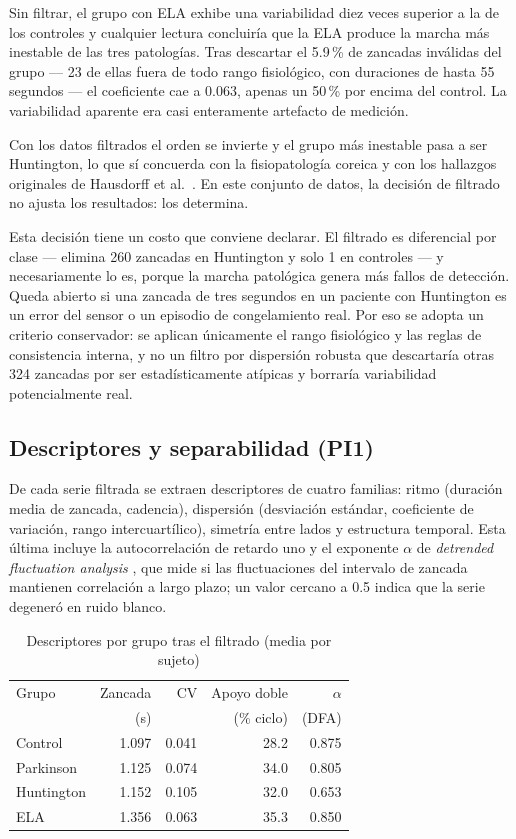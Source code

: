 \documentclass[conference]{IEEEtran}
\begin{document}
Sin filtrar, el grupo con ELA exhibe una variabilidad diez veces superior a la de los controles y cualquier lectura concluiría que la ELA produce la marcha más inestable de las tres patologías. Tras descartar el 5.9\,\% de zancadas inválidas del grupo --- 23 de ellas fuera de todo rango fisiológico, con duraciones de hasta 55 segundos --- el coeficiente cae a 0.063, apenas un 50\,\% por encima del control. La variabilidad aparente era casi enteramente artefacto de medición.

Con los datos filtrados el orden se invierte y el grupo más inestable pasa a ser Huntington, lo que sí concuerda con la fisiopatología coreica y con los hallazgos originales de Hausdorff et al.\ \cite{hausdorff1997}. En este conjunto de datos, la decisión de filtrado no ajusta los resultados: los determina.

Esta decisión tiene un costo que conviene declarar. El filtrado es diferencial por clase --- elimina 260 zancadas en Huntington y solo 1 en controles --- y necesariamente lo es, porque la marcha patológica genera más fallos de detección. Queda abierto si una zancada de tres segundos en un paciente con Huntington es un error del sensor o un episodio de congelamiento real. Por eso se adopta un criterio conservador: se aplican únicamente el rango fisiológico y las reglas de consistencia interna, y no un filtro por dispersión robusta que descartaría otras 324 zancadas por ser estadísticamente atípicas y borraría variabilidad potencialmente real.

\subsection{Descriptores y separabilidad (PI1)}

De cada serie filtrada se extraen descriptores de cuatro familias: ritmo (duración media de zancada, cadencia), dispersión (desviación estándar, coeficiente de variación, rango intercuartílico), simetría entre lados y estructura temporal. Esta última incluye la autocorrelación de retardo uno y el exponente $\alpha$ de \textit{detrended fluctuation analysis} \cite{peng1995}, que mide si las fluctuaciones del intervalo de zancada mantienen correlación a largo plazo; un valor cercano a 0.5 indica que la serie degeneró en ruido blanco.

\begin{table}[t]
\caption{Descriptores por grupo tras el filtrado (media por sujeto)}
\label{tab:descriptores}
\centering
\begin{tabular}{lrrrr}
\toprule
Grupo & Zancada & CV & Apoyo doble & $\alpha$ \\
 & (s) & & (\% ciclo) & (DFA) \\
\midrule
Control    & 1.097 & 0.041 & 28.2 & 0.875 \\
Parkinson  & 1.125 & 0.074 & 34.0 & 0.805 \\
Huntington & 1.152 & 0.105 & 32.0 & 0.653 \\
ELA        & 1.356 & 0.063 & 35.3 & 0.850 \\
\bottomrule
\end{tabular}
\end{table}
\end{document}
